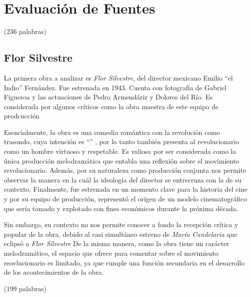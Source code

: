 \section{Evaluación de Fuentes}
(236 palabras)
\subsection{Flor Silvestre}
La primera obra a analizar es \textit{Flor Silvestre}, del director mexicano
Emilio ``el Indio'' Fernández. Fue estrenada en 1943. Cuenta con fotografía de
Gabriel Figueroa y las actuaciones de Pedro Armendáriz y Dolores del Río. 
Es considerada por algunos críticos como la obra maestra de este equipo de prodcucción %

Esencialmente, la obra es una comedia romántica con la revolución como trasondo, cuya intención es ``''%
, por lo tanto también presenta al revolucionario como un hombre virtuoso y respetable.
Es valiosa por ser considerada como la única producción melodramática que
entabla una reflexión sobre el movimiento revolucionario. %
Además, por su naturaleza como producción conjunta nos permite observar la
manera en la cuál la ideología del director se entrecruza con la de su contexto. 
Finalmente, fue estrenada en un momento clave para la historia del cine
y por su equipo de producción, representó el
orígen de un modelo cinematográfico que sería tomado y explotado con fines económicos durante la próxima década. %

Sin embargo, su contexto no nos permite conocer a fondo la recepción crítica y
popular de la obra, debido al casi simultáneo estreno de \textit{María
  Candelaria} que eclipsó  a \textit{Flor Silvestre} %
De la misma manera, como la obra tiene un carácter melodramático, el espacio que ofrece para comentar sobre el movimiento reovlucionario es limitado, ya que cumple una función secundaria en el desarrollo de los acontecimientos de la obra.
 
(199 palabras)

\subsection{}

